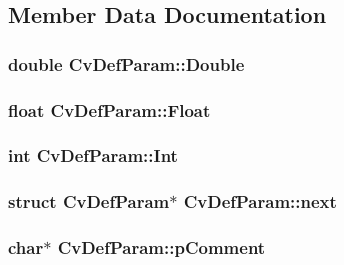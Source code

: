 \subsection{Member Data Documentation}
\hypertarget{structCvDefParam_a6a9577093b1ebedfb431dc7f06ef1ec0}{
\subsubsection[{Double}]{\setlength{\rightskip}{0pt plus 5cm}double Cv\-Def\-Param\-::\-Double}}\label{structCvDefParam_a6a9577093b1ebedfb431dc7f06ef1ec0}
\hypertarget{structCvDefParam_af5fbebcc4a968d15a0f3e52b291b0ca9}{
\subsubsection[{Float}]{\setlength{\rightskip}{0pt plus 5cm}float Cv\-Def\-Param\-::\-Float}}\label{structCvDefParam_af5fbebcc4a968d15a0f3e52b291b0ca9}
\hypertarget{structCvDefParam_a9e80637b6059a368c9877254babe603b}{
\subsubsection[{Int}]{\setlength{\rightskip}{0pt plus 5cm}int Cv\-Def\-Param\-::\-Int}}\label{structCvDefParam_a9e80637b6059a368c9877254babe603b}
\hypertarget{structCvDefParam_ada577807235b973650625acab3cfffc6}{
\subsubsection[{next}]{\setlength{\rightskip}{0pt plus 5cm}struct {\bf Cv\-Def\-Param}$\ast$ Cv\-Def\-Param\-::next}}\label{structCvDefParam_ada577807235b973650625acab3cfffc6}
\hypertarget{structCvDefParam_a8cdbb35a09f1c26fb3cfd56ede3ffeca}{
\subsubsection[{p\-Comment}]{\setlength{\rightskip}{0pt plus 5cm}char$\ast$ Cv\-Def\-Param\-::p\-Comment}}\label{structCvDefParam_a8cdbb35a09f1c26fb3cfd56ede3ffeca}
